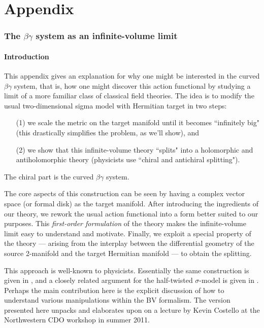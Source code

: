 \part*{Appendix}

\section{The $\beta\gamma$ system as an infinite-volume limit}

\subsection{Introduction}

This appendix gives an explanation for why one might be interested in the curved $\beta\gamma$ system,
that is, how one might discover this action functional by studying a limit of a more familiar class of classical field theories.
The idea is to modify the usual two-dimensional sigma model with Hermitian target in two steps: 
\begin{enumerate}
\item[(1)] we scale the metric on the target manifold until it becomes ``infinitely big" (this drastically simplifies the problem, as we'll show), and 
\item[(2)] we show that this infinite-volume theory ``splits" into a holomorphic and antiholomorphic theory (physicists use ``chiral and antichiral splitting").
\end{enumerate}
The chiral part is the curved $\beta\gamma$ system.

The core aspects of this construction can be seen by having a complex vector space (or formal disk) as the target manifold. After introducing the ingredients of our theory, we rework the usual action functional into a form better suited to our purposes. This {\em first-order formulation} of the theory makes the infinite-volume limit easy to understand and motivate. Finally, we exploit a special property of the theory --- arising from the interplay between the differential geometry of the source 2-manifold and the target Hermitian manifold --- to obtain the splitting.

\begin{rmk}
This approach is well-known to physicists.
Essentially the same construction is given in \cite{Zeitlin,LMZ,Nek}, and a closely related argument for the half-twisted $\sigma$-model is given in \cite{KapCDR}.
Perhaps the main contribution here is the explicit discussion of how to understand various manipulations within the BV formalism.
The version presented here unpacks and elaborates upon on a lecture by Kevin Costello at the Northwestern CDO workshop in summer 2011.
\end{rmk}

